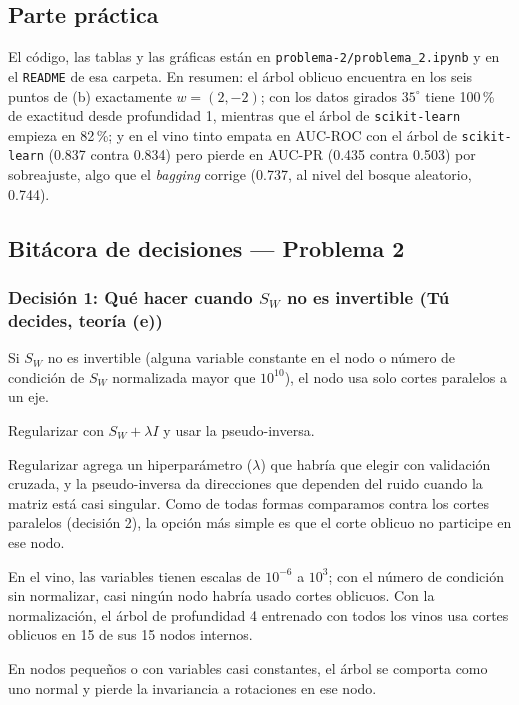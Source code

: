 \documentclass[11pt, letterpaper]{article}
\begin{document}
\subsection{Parte práctica}
El código, las tablas y las gráficas están en \texttt{problema-2/problema\_2.ipynb} y en el \texttt{README} de esa carpeta. En resumen: el árbol oblicuo encuentra en los seis puntos de (b) exactamente $w = (2, -2)$; con los datos girados $35^\circ$ tiene 100\,\% de exactitud desde profundidad 1, mientras que el árbol de \texttt{scikit-learn} empieza en 82\,\%; y en el vino tinto empata en AUC-ROC con el árbol de \texttt{scikit-learn} (0.837 contra 0.834) pero pierde en AUC-PR (0.435 contra 0.503) por sobreajuste, algo que el \emph{bagging} corrige (0.737, al nivel del bosque aleatorio, 0.744).

\subsection{Bitácora de decisiones — Problema 2}

\subsubsection*{Decisión 1: Qué hacer cuando $S_W$ no es invertible (Tú decides, teoría (e))}
\begin{description}[leftmargin=0pt, itemsep=2pt]
    \item[Decisión.] Si $S_W$ no es invertible (alguna variable constante en el nodo o número de condición de $S_W$ normalizada mayor que $10^{10}$), el nodo usa solo cortes paralelos a un eje.
    \item[Alternativas descartadas.] Regularizar con $S_W + \lambda I$ y usar la pseudo-inversa.
    \item[Por qué.] Regularizar agrega un hiperparámetro ($\lambda$) que habría que elegir con validación cruzada, y la pseudo-inversa da direcciones que dependen del ruido cuando la matriz está casi singular. Como de todas formas comparamos contra los cortes paralelos (decisión 2), la opción más simple es que el corte oblicuo no participe en ese nodo.
    \item[Evidencia.] En el vino, las variables tienen escalas de $10^{-6}$ a $10^{3}$; con el número de condición sin normalizar, casi ningún nodo habría usado cortes oblicuos. Con la normalización, el árbol de profundidad 4 entrenado con todos los vinos usa cortes oblicuos en 15 de sus 15 nodos internos.
    \item[Qué perdemos.] En nodos pequeños o con variables casi constantes, el árbol se comporta como uno normal y pierde la invariancia a rotaciones en ese nodo.
\end{description}
\end{document}
